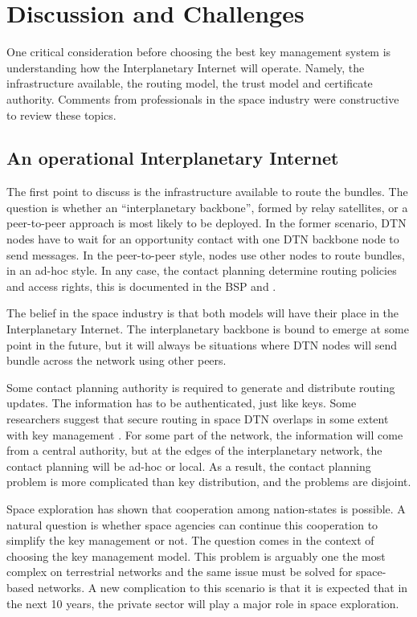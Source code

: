 
\section{Discussion and Challenges}
\label{sec:evaluation}

One critical consideration before choosing the best key management system is understanding how the Interplanetary Internet will operate. Namely, the infrastructure available, the routing model, the trust model and certificate authority. Comments from professionals in the space industry were constructive to review these topics.


\subsection{An operational Interplanetary Internet}

The first point to discuss is the infrastructure available to route the bundles. The question is whether an ``interplanetary backbone'', formed by relay satellites,  or a peer-to-peer approach is most likely to be deployed. In the former scenario, DTN nodes have to wait for an opportunity contact with one DTN backbone node to send messages. In the peer-to-peer style, nodes use other nodes to route bundles, in an ad-hoc style. In any case, the contact planning determine routing policies and access rights, this is documented in the BSP and \cite{cerf2007delay}. 


The belief in the space industry is that both models will have their place in the Interplanetary Internet. The interplanetary backbone is bound to emerge at some point in the future, but it will always be situations where DTN nodes will send bundle across the network using other peers. 

Some contact planning authority is required to generate and distribute routing updates. The information has to be authenticated, just like keys. Some researchers suggest that secure routing in space DTN overlaps in some extent with key management \cite{}. For some part of the network, the information will come from a central authority, but at the edges of the interplanetary network, the contact planning will be ad-hoc or local. As a result, the contact planning problem is more complicated than key distribution, and the problems are disjoint.  


Space exploration has shown that cooperation among nation-states is possible. A natural question is whether space agencies can continue this cooperation to simplify the key management or not. The question comes in the context of choosing the key management model. This problem is arguably one the most complex on terrestrial networks and the same issue must be solved for space-based networks. A new complication to this scenario is that it is expected that in the next 10 years, the private sector will play a major role in space exploration. 



